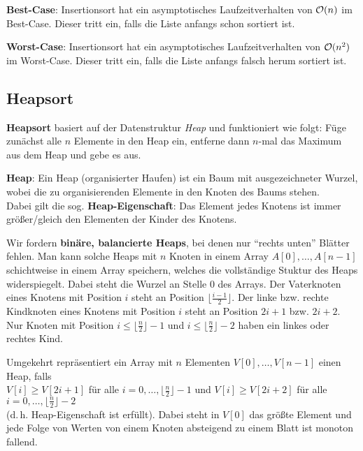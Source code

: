 \linie

\textbf{Best-Case}:
Insertionsort hat ein asymptotisches Laufzeitverhalten von
$\mathcal{O}(n)$ im Best-Case.
Dieser tritt ein, falls die Liste anfangs schon sortiert ist.

\textbf{Worst-Case}:
Insertionsort hat ein asymptotisches Laufzeitverhalten von
$\mathcal{O}(n^2)$ im Worst-Case.
Dieser tritt ein, falls die Liste anfangs falsch herum sortiert ist.

\subsection{%
    Heapsort%
}

\textbf{Heapsort} basiert auf der Datenstruktur \emph{Heap} und funktioniert
wie folgt:
Füge zunächst alle $n$ Elemente in den Heap ein,
entferne dann $n$-mal das Maximum aus dem Heap und gebe es aus.

\textbf{Heap}:
Ein Heap (organisierter Haufen) ist ein Baum mit ausgezeichneter Wurzel, wobei
die zu organisierenden Elemente in den Knoten des Baums stehen. \\
Dabei gilt die sog. \textbf{Heap-Eigenschaft}: Das Element jedes Knotens ist
immer größer/gleich den Elementen der Kinder des Knotens.

\linie

Wir fordern \textbf{binäre, balancierte Heaps}, bei denen nur "`rechts
unten"' Blätter fehlen.
Man kann solche Heaps mit $n$ Knoten in einem Array $A[0], \ldots, A[n - 1]$
schichtweise in einem Array speichern, welches die vollständige Stuktur des
Heaps widerspiegelt.
Dabei steht die Wurzel an Stelle $0$ des Arrays.
Der Vaterknoten eines Knotens mit Position $i$ steht an Position
$\lfloor \frac{i - 1}{2} \rfloor$.
Der linke bzw. rechte Kindknoten eines Knotens mit Position $i$ steht an
Position $2i + 1$ bzw. $2i + 2$.
Nur Knoten mit Position $i \le \lfloor \frac{n}{2} \rfloor - 1$ und
$i \le \lfloor \frac{n}{2} \rfloor - 2$ haben ein linkes oder rechtes Kind.

Umgekehrt repräsentiert ein Array mit $n$ Elementen $V[0], \ldots, V[n - 1]$
einen Heap, falls \\
$V[i] \ge V[2i + 1]$ für alle $i = 0, \ldots, \lfloor \frac{n}{2} \rfloor - 1$
und
$V[i] \ge V[2i + 2]$ für alle $i = 0, \ldots, \lfloor \frac{n}{2} \rfloor - 2$
\\
(d.\,h. Heap-Eigenschaft ist erfüllt).
Dabei steht in $V[0]$ das größte Element und jede Folge von Werten von einem
Knoten absteigend zu einem Blatt ist monoton fallend.

